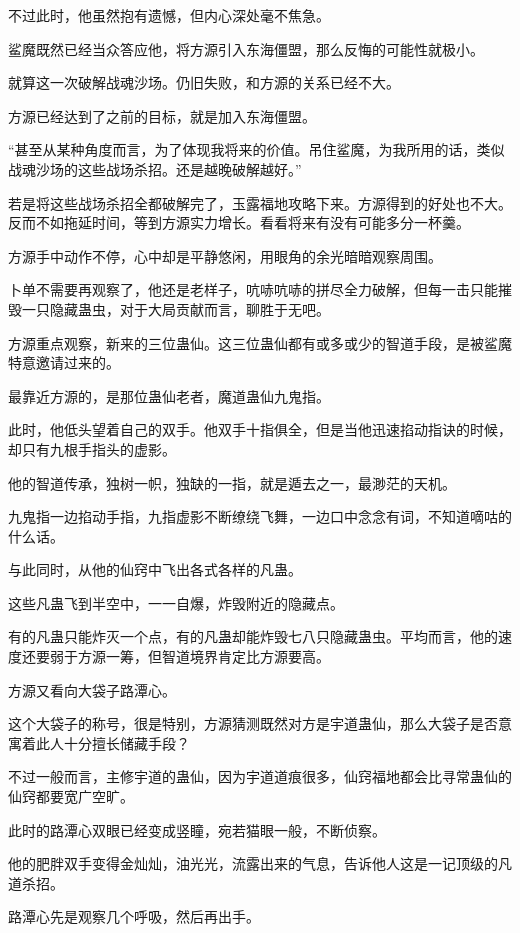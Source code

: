 \begin{this_body}
不过此时，他虽然抱有遗憾，但内心深处毫不焦急。

鲨魔既然已经当众答应他，将方源引入东海僵盟，那么反悔的可能性就极小。

就算这一次破解战魂沙场。仍旧失败，和方源的关系已经不大。

方源已经达到了之前的目标，就是加入东海僵盟。

“甚至从某种角度而言，为了体现我将来的价值。吊住鲨魔，为我所用的话，类似战魂沙场的这些战场杀招。还是越晚破解越好。”

若是将这些战场杀招全都破解完了，玉露福地攻略下来。方源得到的好处也不大。反而不如拖延时间，等到方源实力增长。看看将来有没有可能多分一杯羹。

方源手中动作不停，心中却是平静悠闲，用眼角的余光暗暗观察周围。

卜单不需要再观察了，他还是老样子，吭哧吭哧的拼尽全力破解，但每一击只能摧毁一只隐藏蛊虫，对于大局贡献而言，聊胜于无吧。

方源重点观察，新来的三位蛊仙。这三位蛊仙都有或多或少的智道手段，是被鲨魔特意邀请过来的。

最靠近方源的，是那位蛊仙老者，魔道蛊仙九鬼指。

此时，他低头望着自己的双手。他双手十指俱全，但是当他迅速掐动指诀的时候，却只有九根手指头的虚影。

他的智道传承，独树一帜，独缺的一指，就是遁去之一，最渺茫的天机。

九鬼指一边掐动手指，九指虚影不断缭绕飞舞，一边口中念念有词，不知道嘀咕的什么话。

与此同时，从他的仙窍中飞出各式各样的凡蛊。

这些凡蛊飞到半空中，一一自爆，炸毁附近的隐藏点。

有的凡蛊只能炸灭一个点，有的凡蛊却能炸毁七八只隐藏蛊虫。平均而言，他的速度还要弱于方源一筹，但智道境界肯定比方源要高。

方源又看向大袋子路潭心。

这个大袋子的称号，很是特别，方源猜测既然对方是宇道蛊仙，那么大袋子是否意寓着此人十分擅长储藏手段？

不过一般而言，主修宇道的蛊仙，因为宇道道痕很多，仙窍福地都会比寻常蛊仙的仙窍都要宽广空旷。

此时的路潭心双眼已经变成竖瞳，宛若猫眼一般，不断侦察。

他的肥胖双手变得金灿灿，油光光，流露出来的气息，告诉他人这是一记顶级的凡道杀招。

路潭心先是观察几个呼吸，然后再出手。


\end{this_body}
